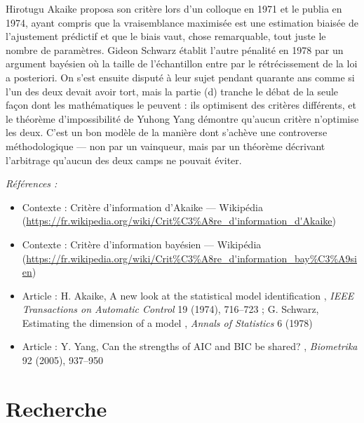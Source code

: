 \documentclass[11pt]{article}
\newenvironment{refs}{\par\small\noindent\emph{Références :}\begin{itemize}\setlength\itemsep{0pt}}{\end{itemize}\normalsize}
\begin{document}
\noindent Hirotugu Akaike proposa son critère lors d'un colloque en 1971 et le publia en
1974, ayant compris que la vraisemblance maximisée est une estimation biaisée de l'ajustement
prédictif et que le biais vaut, chose remarquable, tout juste le nombre de paramètres. Gideon
Schwarz établit l'autre pénalité en 1978 par un argument bayésien où la taille de l'échantillon
entre par le rétrécissement de la loi a posteriori. On s'est ensuite disputé à leur sujet pendant
quarante ans comme si l'un des deux devait avoir tort, mais la partie (d) tranche le débat de la
seule façon dont les mathématiques le peuvent : ils optimisent des critères différents, et le
théorème d'impossibilité de Yuhong Yang démontre qu'aucun critère n'optimise les deux. C'est un bon
modèle de la manière dont s'achève une controverse méthodologique --- non par un vainqueur, mais par
un théorème décrivant l'arbitrage qu'aucun des deux camps ne pouvait éviter.

\begin{refs}
\item Contexte : Critère d'information d'Akaike --- Wikipédia (\url{https://fr.wikipedia.org/wiki/Crit%C3%A8re_d'information_d'Akaike})
\item Contexte : Critère d'information bayésien --- Wikipédia (\url{https://fr.wikipedia.org/wiki/Crit%C3%A8re_d'information_bay%C3%A9sien})
\item Article : H. Akaike, \og{} A new look at the statistical model identification \fg{}, \textit{IEEE Transactions on Automatic Control} 19 (1974), 716--723 ; G. Schwarz, \og{} Estimating the dimension of a model \fg{}, \textit{Annals of Statistics} 6 (1978)
\item Article : Y. Yang, \og{} Can the strengths of AIC and BIC be shared? \fg{}, \textit{Biometrika} 92 (2005), 937--950
\end{refs}

\bigskip


\section*{Recherche}
\end{document}
